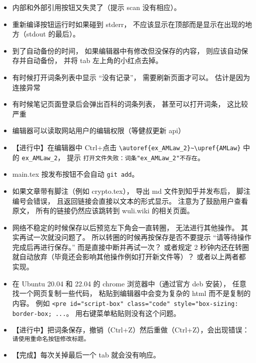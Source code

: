 \begin{itemize}
\item 内部和外部引用按钮又失灵了（提示 scan 没有相应）。

\item 重新编译按钮运行时如果碰到 stderr， 不应该显示在顶部而是显示在出现的地方（stdout 的最后）。

\item 到了自动备份的时间， 如果编辑器中有修改但没保存的内容， 则应该自动保存并自动备份， 并将 tab 左上角的小红点去掉。

\item 有时候打开词条列表中显示 “没有记录”， 需要刷新页面才可以。 估计是因为连接异常

\item 有时候笔记页面登录后会弹出百科的词条列表， 甚至可以打开词条， 这比较严重

\item 编辑器可以读取网站用户的编辑权限（等健叔更新 api）

\item 【进行中】在编辑器中 Ctrl+点击 \verb|\autoref{ex_AMLaw_2}~\upref{AMLaw}| 中的 \verb|ex_AMLaw_2|， 提示 \verb|打开文件失败：词条"ex_AMLaw_2"不存在|。

\item main.tex 按发布按钮不会自动 \verb|git add|。

\item 如果文章带有脚注（例如 crypto.tex）， 导出 md 文件到知乎并发布后， 脚注编号会错误， 且返回链接会直接以文本的形式显示。 注意为了鼓励用户查看原文， 所有的链接仍然应该跳转到 wuli.wiki 的相关页面。

\item 网络不稳定的时候保存以后预览左下角会一直转圈， 无法进行其他操作。 其实再试一次就没问题了。 所以转圈的时候再按保存是否不要提示 “请等待操作完成后再进行保存。” 而是直接中断并再试一次？ 或者规定 2 秒钟内还在转圈就自动放弃（毕竟还会影响其他操作例如打开新文件等）？ 或者以上两者都实现。

\item 在 Ubuntu 20.04 和 22.04 的 chrome 浏览器中（通过官方 deb 安装）， 任意找一个网页复制一些代码， 粘贴到编辑器中会变为复杂的 html 而不是复制的内容。 例如 \verb|<pre id="script-box" class="code" style="box-sizing: border-box; ...|。 用右键菜单粘贴则没有这个问题。

\item 【进行中】把词条保存，撤销（Ctrl+Z）然后重做（Ctrl+Z），会出现错误： \verb|请使用重命名按钮修改标题。|

\item 【完成】每次关掉最后一个 tab 就会没有响应。


\end{itemize}
